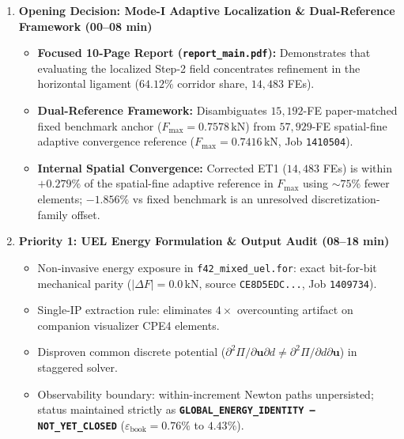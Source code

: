 \documentclass[10pt,a4paper]{article}
\begin{document}
\begin{enumerate}[label=\textbf{\arabic*.},leftmargin=5mm,itemsep=2.5pt,topsep=1.5pt]
  \item \textbf{Opening Decision: Mode-I Adaptive Localization \& Dual-Reference Framework (00--08 min)}
  \begin{itemize}[itemsep=0.8pt,topsep=0.8pt,leftmargin=4mm]
    \small
    \item \textbf{Focused 10-Page Report (\texttt{report\_main.pdf}):} Demonstrates that evaluating the localized Step-2 field concentrates refinement in the horizontal ligament ($64.12\%$ corridor share, $14{,}483$ FEs).
    \item \textbf{Dual-Reference Framework:} Disambiguates $15{,}192$-FE paper-matched fixed benchmark anchor ($F_{\max}=0.7578\,\mathrm{kN}$) from $57{,}929$-FE spatial-fine adaptive convergence reference ($F_{\max}=0.7416\,\mathrm{kN}$, Job \texttt{1410504}).
    \item \textbf{Internal Spatial Convergence:} Corrected ET1 ($14{,}483$ FEs) is within \textbf{$+0.279\%$} of the spatial-fine adaptive reference in $F_{\max}$ using $\sim75\%$ fewer elements; $-1.856\%$ vs fixed benchmark is an unresolved discretization-family offset.
  \end{itemize}

  \item \textbf{Priority 1: UEL Energy Formulation \& Output Audit (08--18 min)}
  \begin{itemize}[itemsep=0.8pt,topsep=0.8pt,leftmargin=4mm]
    \small
    \item Non-invasive energy exposure in \texttt{f42\_mixed\_uel.for}: exact bit-for-bit mechanical parity ($|\Delta F| = 0.0\,\mathrm{kN}$, source \texttt{CE8D5EDC...}, Job \texttt{1409734}).
    \item Single-IP extraction rule: eliminates $4\times$ overcounting artifact on companion visualizer CPE4 elements.
    \item Disproven common discrete potential ($\partial^2 \Pi / \partial \mathbf{u} \partial d \ne \partial^2 \Pi / \partial d \partial \mathbf{u}$) in staggered solver.
    \item Observability boundary: within-increment Newton paths unpersisted; status maintained strictly as \textbf{\texttt{GLOBAL\_ENERGY\_IDENTITY --- NOT\_YET\_CLOSED}} ($\varepsilon_{\mathrm{book}} = 0.76\%$ to $4.43\%$).
  \end{itemize}


\end{enumerate}
\end{document}
